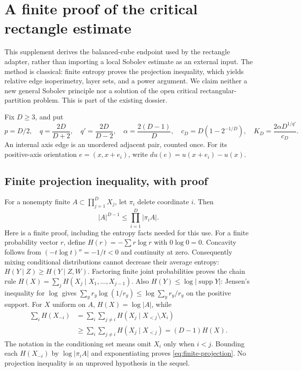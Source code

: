 \section{A finite proof of the critical rectangle estimate}
\label{sec:self-contained-box-sobolev}
This supplement derives the balanced-cube endpoint used by the rectangle
adapter, rather than importing a local Sobolev estimate as an external input.
The method is classical: finite entropy proves the projection inequality,
which yields relative edge isoperimetry, layer sets, and a power argument.
We claim neither a new general Sobolev principle nor a solution of the open
critical rectangular-partition problem. This is part of the existing dossier.

Fix $D\geq3$, and put
\[
 p=D/2,\quad q=\frac{2D}{D+2},\quad q'=\frac{2D}{D-2},\quad
 \alpha=\frac{2(D-1)}D,\quad c_D=D(1-2^{-1/D}),\quad
 K_D=\frac{2\alpha D^{1/q'}}{c_D}.
\]
An internal axis edge is an unordered adjacent pair, counted once. For its
positive-axis orientation $e=(x,x+e_i)$, write $du(e)=u(x+e_i)-u(x)$.

\subsection{Finite projection inequality, with proof}
For a nonempty finite $A\subset\prod_{j=1}^D X_j$, let $\pi_i$ delete
coordinate $i$. Then
\begin{equation}\label{eq:finite-projection}
 |A|^{D-1}\leq\prod_{i=1}^D|\pi_i A|.
\end{equation}
Here is a finite proof, including the entropy facts needed for this use.
For a finite probability vector $r$, define $H(r)=-\sum r\log r$ with
$0\log0=0$. Concavity follows from $(-t\log t)''=-1/t<0$ and continuity at
zero. Consequently mixing conditional distributions cannot decrease their
average entropy: $H(Y\mid Z)\geq H(Y\mid Z,W)$. Factoring finite joint
probabilities proves the chain rule
$H(X)=\sum_jH(X_j\mid X_1,\ldots,X_{j-1})$.
Also $H(Y)\leq\log|\operatorname{supp}Y|$: Jensen's inequality for $\log$
gives $\sum_y r_y\log(1/r_y)\leq\log\sum_y r_y/r_y$ on the positive support.
For $X$ uniform on $A$, $H(X)=\log|A|$, while
\[
 \begin{split}
 \sum_i H(X_{-i})
 &=\sum_i\sum_{j\ne i}H(X_j\mid X_{<j}\setminus X_i)\\
 &\geq\sum_i\sum_{j\ne i}H(X_j\mid X_{<j})
 =(D-1)H(X).
 \end{split}
\]
The notation in the conditioning set means omit $X_i$ only when $i<j$.
Bounding each $H(X_{-i})$ by $\log|\pi_i A|$ and exponentiating proves
\eqref{eq:finite-projection}. No projection inequality is an unproved
hypothesis in the sequel.

